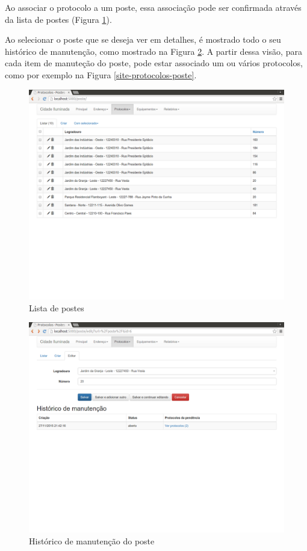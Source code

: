 \documentclass[
	article,			%
	11pt,				%
	oneside,			%
	a4paper,			%
	english,			%
	brazil,				%
	sumario=tradicional
	]{abntex2}
\begin{document}
\clearpage

Ao associar o protocolo a um poste, essa associação pode ser confirmada através da lista de postes
(Figura \ref{site-lista-poste}).

Ao selecionar o poste que se deseja ver em detalhes, é mostrado todo o seu histórico de manutenção,
como mostrado na Figura \ref{site-historico-manutencao}. A partir dessa visão, para cada item de
manuteção do poste, pode estar associado um ou vários protocolos, como por exemplo na Figura
\ref{site-protocolos-poste}.

\begin{figure}[!htbp]
 \centering
 \caption{\label{site-lista-poste}Lista de postes}
 \includegraphics[scale=0.25]{site/4-lista_postes.png}
\end{figure}

\begin{figure}[!htbp]
 \centering
 \caption{\label{site-historico-manutencao}Histórico de manutenção do poste}
 \includegraphics[scale=0.25]{site/5-historico_manutencao_poste.png}
\end{figure}
\end{document}
